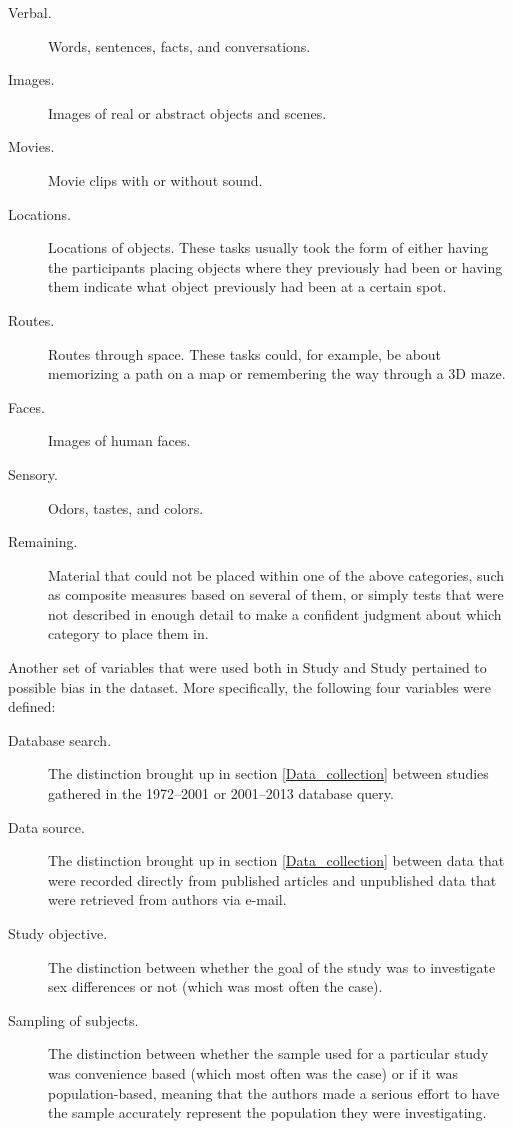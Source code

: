 \begin{description} \item [Verbal.] Words, sentences, facts, and conversations. \item [Images.] Images of real or abstract objects and scenes. \item [Movies.] Movie clips with or without sound. \item [Locations.] Locations of objects. These tasks usually took the form of either having the participants placing objects where they previously had been or having them indicate what object previously had been at a certain spot. \item [Routes.] Routes through space. These tasks could, for example, be about memorizing a path on a map or remembering the way through a 3D maze. \item [Faces.] Images of human faces. \item [Sensory.] Odors, tastes, and colors. \item [Remaining.] Material that could not be placed within one of the above categories, such as composite measures based on several of them, or simply tests that were not described in enough detail to make a confident judgment about which category to place them in. \end{description}

Another set of variables that were used both in Study  and Study  pertained to possible bias in the dataset. More specifically, the following four variables were defined:

\begin{description} \item [Database search.] The distinction brought up in section \ref{Data_collection} between studies gathered in the 1972--2001 or 2001--2013 database query. \item [Data source.] The distinction brought up in section \ref{Data_collection} between data that were recorded directly from published articles and unpublished data that were retrieved from authors via e-mail. \item [Study objective.] The distinction between whether the goal of the study was to investigate sex differences or not (which was most often the case). \item [Sampling of subjects.] The distinction between whether the sample used for a particular study was convenience based (which most often was the case) or if it was population-based, meaning that the authors made a serious effort to have the sample accurately represent the population they were investigating. \end{description}

